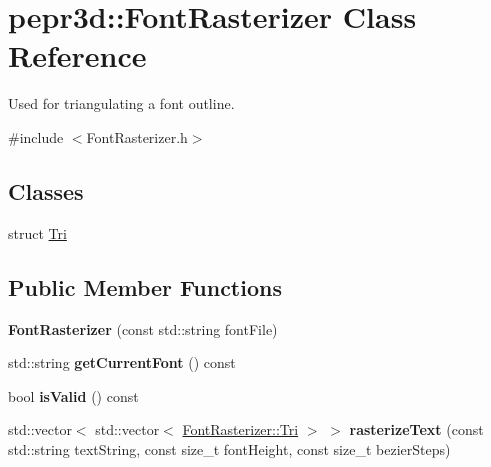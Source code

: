 \hypertarget{classpepr3d_1_1_font_rasterizer}{}\section{pepr3d\+::Font\+Rasterizer Class Reference}
\label{classpepr3d_1_1_font_rasterizer}


Used for triangulating a font outline.  




{\ttfamily \#include $<$Font\+Rasterizer.\+h$>$}

\subsection*{Classes}
\begin{DoxyCompactItemize}
\item 
struct \mbox{\hyperlink{structpepr3d_1_1_font_rasterizer_1_1_tri}{Tri}}
\end{DoxyCompactItemize}
\subsection*{Public Member Functions}
\begin{DoxyCompactItemize}
\item 
\mbox{\label{classpepr3d_1_1_font_rasterizer_a7099a831f003a1e9f15e3d28918613b7}} 
{\bfseries Font\+Rasterizer} (const std\+::string font\+File)
\item 
\mbox{\label{classpepr3d_1_1_font_rasterizer_acbb4bdd3f6183bebe44bc4bd38321b4d}} 
std\+::string {\bfseries get\+Current\+Font} () const
\item 
\mbox{\label{classpepr3d_1_1_font_rasterizer_a965167ef18771ff5b19f1bcfbb0403e0}} 
bool {\bfseries is\+Valid} () const
\item 
\mbox{\label{classpepr3d_1_1_font_rasterizer_a5632080c9dd7163ca8b3635820083148}} 
std\+::vector$<$ std\+::vector$<$ \mbox{\hyperlink{structpepr3d_1_1_font_rasterizer_1_1_tri}{Font\+Rasterizer\+::\+Tri}} $>$ $>$ {\bfseries rasterize\+Text} (const std\+::string text\+String, const size\+\_\+t font\+Height, const size\+\_\+t bezier\+Steps)
\end{DoxyCompactItemize}
